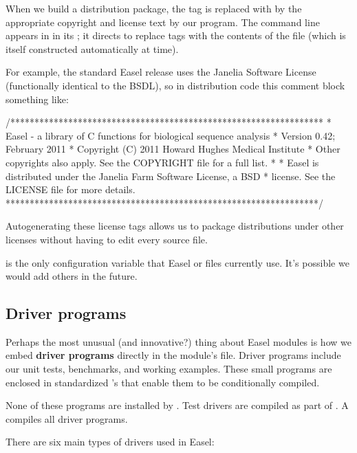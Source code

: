When we build a distribution package, the  tag is
replaced with by the appropriate copyright and license text by our
 program. The command line appears in
 in its ; it directs
 to replace  tags with the contents of
the  file (which is itself constructed
automatically at  time).

For example, the standard Easel release uses the Janelia Software
License (functionally identical to the BSDL), so in distribution code
this comment block something like:

\begin{cchunk}
/*****************************************************************
 * Easel - a library of C functions for biological sequence analysis
 * Version 0.42; February 2011
 * Copyright (C) 2011 Howard Hughes Medical Institute
 * Other copyrights also apply. See the COPYRIGHT file for a full list.
 *
 * Easel is distributed under the Janelia Farm Software License, a BSD
 * license. See the LICENSE file for more details.
 *****************************************************************/
\end{cchunk}

Autogenerating these license tags allows us to package distributions
under other licenses without having to edit every source file.

 is the only configuration variable that Easel
 or  files currently use. It's possible we would
add others in the future.


\subsection{Driver programs}

Perhaps the most unusual (and innovative?) thing about Easel modules
is how we embed {\bfseries driver programs} directly in the module's
 file. Driver programs include our unit tests, benchmarks,
and working examples. These small programs are enclosed in
standardized 's that enable them to be conditionally
compiled. 

None of these programs are installed by .  Test
drivers are compiled as part of .  A  compiles all driver programs.

There are six main types of drivers used in Easel:

